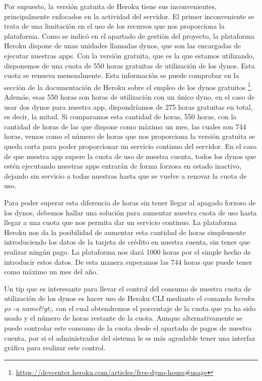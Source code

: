 Por supuesto, la versión gratuita de Heroku tiene sus inconvenientes, principalmente enfocados en la actividad del servidor. El primer inconveniente se trata de una limitación en el uso de los recursos que nos proporciona la plataforma. Como se indicó en el apartado de gestión del proyecto, la plataforma Heroku dispone de unas unidades llamadas dynos, que son las encargadas de ejecutar nuestras apps. Con la versión gratuita, que es la que estamos utilizando, disponemos de una cuota de 550 horas gratuitas de utilización de los dynos. Esta cuota se renueva mensualmente. Esta información se puede comprobar en la sección de la documentación de Heroku sobre el empleo de los dynos gratuitos \footnote{\url{https://devcenter.heroku.com/articles/free-dyno-hours#usage}}. Además, esas 550 horas son horas de utilización con un único dyno, en el caso de usar dos dynos para nuestra app, dispondríamos de 275 horas gratuitas en total, es decir, la mitad. Si comparamos esta cantidad de horas, 550 horas, con la cantidad de horas de las que dispone como máximo un mes, las cuales son 744 horas, vemos como el número de horas que nos proporciona la versión gratuita se queda corta para poder proporcionar un servicio continuo del servidor. En el caso de que nuestra app supere la cuota de uso de nuestra cuenta, todos los dynos que estén ejecutando nuestras apps entrarán de forma forzosa en estado inactivo, dejando sin servicio a todas nuestras hasta que se vuelve a renovar la cuota de uso.

Para poder superar esta diferencia de horas sin tener llegar al apagado forzoso de los dynos, debemos hallar una solución para aumentar nuestra cuota de uso hasta llegar a una cuota que nos permita dar un servicio continuo. La plataforma Heroku nos da la posibilidad de aumentar esta cantidad de horas simplemente introduciendo los datos de la tarjeta de crédito en nuestra cuenta, sin tener que realizar ningún pago. La plataforma nos dará 1000 horas por el simple hecho de introducir estos datos. De esta manera superamos las 744 horas que puede tener como máximo un mes del año.

Un tip que es interesante para llevar el control del consumo de nuestra cuota de utilización de los dynos es hacer uso de Heroku CLI mediante el comando \textit{heroku ps -a name&gt;}, con el cual obtendremos el porcentaje de la cuota que ya ha sido usado y el número de horas restante de la cuota. Aunque alternativamente se puede controlar este consumo de la cuota desde el apartado de pagos de nuestra cuenta, por si el administrador del sistema le es más agradable tener una interfaz gráfica para realizar este control.


